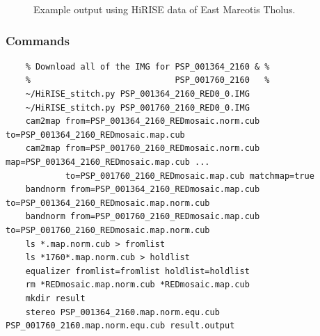 \begin{figure}[h!]
\centering
  \hfil
\caption{Example output using HiRISE data of East Mareotis Tholus.}
\label{fig:hirise_emare_example}
\end{figure}

\subsubsection*{Commands}

\begin{verbatim}
    % Download all of the IMG for PSP_001364_2160 & %
    %                             PSP_001760_2160   %
    ~/HiRISE_stitch.py PSP_001364_2160_RED0_0.IMG
    ~/HiRISE_stitch.py PSP_001760_2160_RED0_0.IMG
    cam2map from=PSP_001364_2160_REDmosaic.norm.cub to=PSP_001364_2160_REDmosaic.map.cub
    cam2map from=PSP_001760_2160_REDmosaic.norm.cub map=PSP_001364_2160_REDmosaic.map.cub ...
            to=PSP_001760_2160_REDmosaic.map.cub matchmap=true
    bandnorm from=PSP_001364_2160_REDmosaic.map.cub to=PSP_001364_2160_REDmosaic.map.norm.cub
    bandnorm from=PSP_001760_2160_REDmosaic.map.cub to=PSP_001760_2160_REDmosaic.map.norm.cub
    ls *.map.norm.cub > fromlist
    ls *1760*.map.norm.cub > holdlist
    equalizer fromlist=fromlist holdlist=holdlist
    rm *REDmosaic.map.norm.cub *REDmosaic.map.cub
    mkdir result
    stereo PSP_001364_2160.map.norm.equ.cub PSP_001760_2160.map.norm.equ.cub result.output
\end{verbatim}

